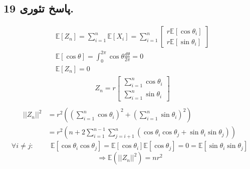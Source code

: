 \documentclass[]{article}
\begin{document}
\subsection{پاسخ تئوری 19.}
\begin{equation}
	\nonumber
	\begin{split}
		&\mathbb{E}[Z_n] = \sum_{i = 1}^{n} \mathbb{E}[X_i] = \sum_{i = 1}^{n} 
		\begin{bmatrix}
			r \mathbb{E}[\cos \theta_i]\\
			r \mathbb{E}[\sin \theta_i]
		\end{bmatrix}
		\\
		&\mathbb{E}[\cos \theta] = \int_{0}^{2\pi} \cos \theta \frac{d\theta}{2\pi} = 0\\
		&\mathbb{E}[Z_n] = 0		
	\end{split}
\end{equation}
\begin{equation}
	\nonumber
	\begin{split}
		&Z_n = r 
		\begin{bmatrix}
			\sum_{i = 1}^{n} \cos \theta_i\\
			\sum_{i = 1}^{n} \sin \theta_i
		\end{bmatrix}
		\\
	\end{split}
\end{equation}
\begin{equation}
	\nonumber
	\begin{split}
		|| Z_n ||^2 &= r^2 ((\sum_{i = 1}^{n}\cos \theta_i)^2 + (\sum_{i = 1}^{n}\sin \theta_i)^2)\\
		&= r^2 (n + 2 \sum_{i = 1}^{n - 1}\sum_{j = i+1}^{n}(\cos \theta_i \cos \theta_j + \sin \theta_i \sin \theta_j))
	\end{split}
\end{equation}
\begin{equation}
	\nonumber
	\forall i \neq j :\hspace{1cm} \mathbb{E}[\cos \theta_i \cos \theta_j] = \mathbb{E}[\cos \theta_i] \mathbb{E}[\cos \theta_j] = 0 = \mathbb{E}[\sin \theta_i \sin \theta_j]
\end{equation}
\begin{equation}
	\nonumber
	\Rightarrow \mathbb{E}(||Z_n||^2) = nr^2
\end{equation}
\end{document}
